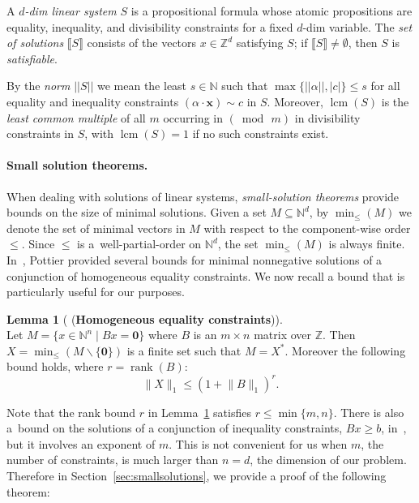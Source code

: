 \documentclass[11pt,a4paper]{amsart}
\newcommand{\bvar}[1]{\mathbf{#1}}
\newcommand{\nnorm}[1]{||#1||}
\newcommand{\Nat}{\mathbb{N}}
\newcommand{\Zset}{\mathbb{Z}}
\newcommand{\setN}{\Nat}
\newcommand{\setZ}{\Zset}
\newcommand{\norm}[2]{\lVert #2 \rVert_{#1}}
\newcommand{\scalar}[2]{(#1 \cdot #2)}
\newcommand{\rank}[1]{\operatorname{rank}(#1)}
\newcommand{\sem}[1]{\llbracket#1\rrbracket}
\newcommand{\mlcm}[1]{\operatorname{lcm}(#1)}
\theoremstyle{plain}
\theoremstyle{definition}
\theoremstyle{defC}
\theoremstyle{thmC}
\newtheorem{lemC}[thm]{Lemma}
\begin{document}
A \emph{$d$-dim linear system} $S$
is a propositional formula whose atomic propositions are 
equality, inequality, and divisibility constraints for a fixed
$d$-dim variable.
The \emph{set of solutions} $\sem{S}$ 
 consists of the vectors $x\in\setZ^d$
satisfying $S$; if $\sem{S}\neq\emptyset$, then 
$S$ is \emph{satisfiable}. 

By the \emph{norm}
$\nnorm{S}$ we mean the least $s\in\setN$ such that 
$\max\{\nnorm{\alpha},|c|\}\leq s$
for all equality and inequality constraints $\scalar{\alpha}{\bvar{x}}\sim c$ in
$S$.
Moreover, $\mlcm{S}$ is the \emph{least common multiple} of all $m$
occurring in $(\bmod\, m)$ in 
divisibility constraints 
in $S$, with $\mlcm{S}=1$ if no such
constraints exist.

\paragraph{Small solution theorems.}
When dealing with solutions of linear systems, \emph{small-solution
theorems} provide bounds on the size of minimal solutions. 
Given a set $M\subseteq \setN^d$, 
by $\min_\leq(M)$ we denote the set of minimal vectors in $M$ with
respect to
the component-wise order $\leq$. Since $\leq$ is 
a~well-partial-order on $\setN^d$, the set $\min_\leq(M)$ is
always finite.
In~\cite{DBLP:conf/rta/Pottier91}, 
Pottier provided several
bounds for minimal
nonnegative solutions of a conjunction of homogeneous equality constraints. 
We now recall a bound that is particularly useful for our purposes.


\begin{lemC}[\cite{DBLP:conf/rta/Pottier91} (\textbf{Homogeneous
	equality constraints})]\label{lem:smallsolution}
\hfill\\	
  Let $M=\{x\in\setN^n \mid Bx=\mathbf{0}\}$ where $B$ is an $m\times n$
	matrix over $\setZ$. Then
	$X=\min_{\leq}(M\smallsetminus\{\mathbf{0}\})$ is a finite set
	such that $M=X^*$. Moreover the following bound holds, where
	$r=\rank{B}$:
\begin{equation*}
\norm{1}{X}\leq (1+\norm{1}{B})^r.
\end{equation*}
\end{lemC}

\noindent
Note that the rank bound $r$ in
Lemma~\ref{lem:smallsolution} satisfies $r\leq\min\{m,n\}$.
There is also a~bound on the
solutions of a conjunction of inequality constraints, 
$Bx\geq b$, in~\cite{DBLP:conf/rta/Pottier91}, but it involves an exponent
of $m$. This is not convenient for us when $m$, the number of
constraints, is much larger than $n=d$, the dimension of our problem.
Therefore in Section~\ref{sec:smallsolutions}, we provide a proof of
the following theorem:
\end{document}
